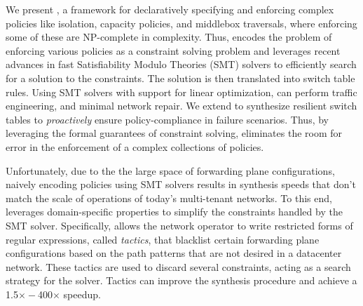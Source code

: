 We present \Name, a framework for declaratively specifying and
enforcing complex policies 
like isolation, capacity policies, and middlebox
traversals, where enforcing some of these are
NP-complete in complexity. 
Thus, \Name 
encodes the problem of enforcing various
policies as a constraint solving problem and
leverages recent advances in
fast Satisfiability Modulo Theories (SMT) solvers
to efficiently search for a solution to the constraints. 
The solution is then translated into switch table rules. 
Using SMT solvers with 
support for linear optimization, \name can perform traffic engineering, and
minimal network repair. We extend \name to synthesize
resilient switch tables to \emph{proactively} ensure policy-compliance
in failure scenarios. 
Thus, by leveraging the formal guarantees of constraint solving, \Name
eliminates the room for error in the enforcement of 
a complex collections of policies. 


Unfortunately, due to the the large space of forwarding plane
configurations, naively encoding policies using SMT solvers results in
synthesis speeds that don't match the scale of operations of today's
multi-tenant networks.
To this
end, \Name leverages domain-specific properties to simplify the
constraints handled by the SMT solver.  Specifically, \Name allows the
network operator to write 
restricted forms of regular expressions, called \emph{tactics}, 
that blacklist certain
forwarding plane configurations based on the path patterns   
that are not desired in a datacenter network. 
These tactics are used to discard several constraints, 
acting as a search strategy for the solver.
Tactics can improve the synthesis procedure and achieve
a 1.5$\times - $400$\times$ speedup. 

